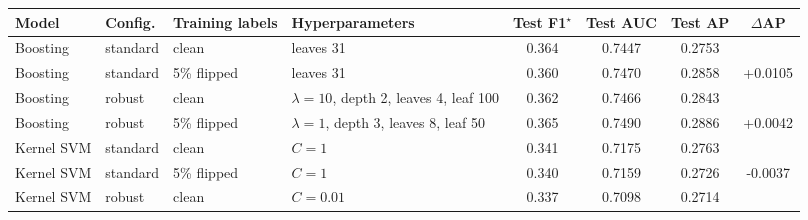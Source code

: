 \begin{tabular}{llllcccc}
\toprule
Model & Config. & Training labels & Hyperparameters & Test F1$^{\star}$ & Test AUC & Test AP & $\Delta$AP \\
\midrule
Boosting & standard & clean & leaves 31 & 0.364 & 0.7447 & 0.2753 &  \\
Boosting & standard & 5\% flipped & leaves 31 & 0.360 & 0.7470 & 0.2858 & +0.0105 \\
Boosting & robust & clean & $\lambda = 10$, depth 2, leaves 4, leaf 100 & 0.362 & 0.7466 & 0.2843 &  \\
Boosting & robust & 5\% flipped & $\lambda = 1$, depth 3, leaves 8, leaf 50 & 0.365 & 0.7490 & 0.2886 & +0.0042 \\
\addlinespace
Kernel SVM & standard & clean & $C = 1$ & 0.341 & 0.7175 & 0.2763 &  \\
Kernel SVM & standard & 5\% flipped & $C = 1$ & 0.340 & 0.7159 & 0.2726 & -0.0037 \\
Kernel SVM & robust & clean & $C = 0.01$ & 0.337 & 0.7098 & 0.2714 &  \\
\bottomrule
\end{tabular}
